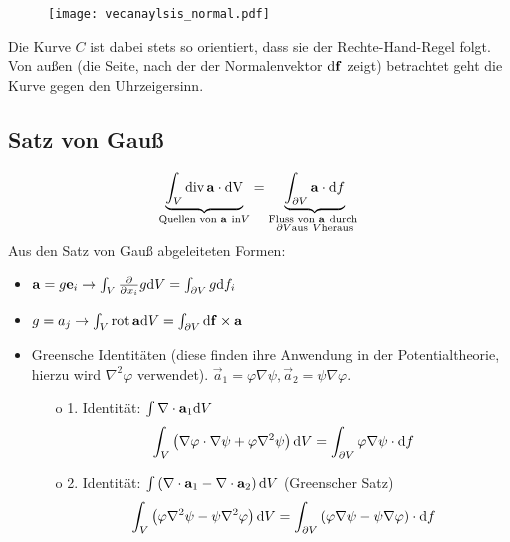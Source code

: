 \begin{figure}[htb]
	\centering
	\texttt{[image: vecanaylsis\_normal.pdf]}
	\caption{}
	\label{fig:vecanaylsis_normal}
\end{figure}

Die Kurve $C$ ist dabei stets so orientiert, dass sie der Rechte-Hand-Regel folgt. Von außen (die Seite, nach der der Normalenvektor $\text{d} \mathbf{f}$ zeigt) betrachtet geht die Kurve gegen den Uhrzeigersinn.

\subsection{Satz von Gauß\label{ref-013}}


\begin{equation*}
	\underset{\text{Quellen von }\mathbf{a}~\mathrm{in} V}{\underbrace{ \int _{V}\operatorname{div} \mathbf{a}\cdot \mathrm{dV}}}=\underset{\substack{
			\text{Fluss von }\mathbf{a}~\text{durch } \\
			\partial V \mathrm{aus}~V \text{heraus}
		}}{\underbrace{\int _{\partial V}\mathbf{a}\cdot \text{d} f}}
\end{equation*}
Aus den Satz von Gauß abgeleiteten Formen:
\begin{itemize}
	\item $\mathbf{a}=g\mathbf{e}_{i}\rightarrow \int _{V}\frac{\partial }{\partial x_{i}}g\text{d} V=\int _{\partial V}g\text{d} f_{i}$

	\item $g=a_{j}\rightarrow \int _{V}\operatorname{rot} \mathbf{a}\text{d} V=\int _{\partial V}\text{d} \mathbf{f}\times \mathbf{a}$

	\item Greensche Identitäten (diese finden ihre Anwendung in der Potentialtheorie, hierzu wird $\nabla ^{2}\varphi $ verwendet). $\vec {a}_{1}=\varphi \nabla \psi , \vec {a}_{2}=\psi \nabla \varphi $. \begin{enumerate}[a]
		      \setcounter{enumii}{14}

		      \item[o] 1. Identität: $\int \nabla \cdot \mathbf{a}_{1}\text{d} V$
			      \begin{equation*}
				      \int _{V}\left(\nabla \varphi \cdot \nabla \psi +\varphi \nabla ^{2}\psi \right)\text{d} V=\int _{\partial V}\varphi \nabla \psi \cdot \text{d} f
			      \end{equation*}
		      \item[o] 2. Identität: $\int \left(\nabla \cdot \mathbf{a}_{1}-\nabla \cdot \mathbf{a}_{2}\right)\text{d} V$ (Greenscher Satz)
			      \begin{equation*}
				      \int _{V}\left(\varphi \nabla ^{2}\psi -\psi \nabla ^{2}\varphi \right)\text{d} V=\int _{\partial V}\left(\varphi \nabla \psi -\psi \nabla \varphi \right)\cdot \text{d} f
			      \end{equation*}
	      \end{enumerate}

\end{itemize}
